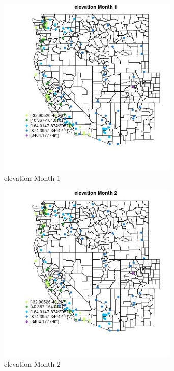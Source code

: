 \begin{figure} 
\centering  
\includegraphics[width=0.77\textwidth]{Code_Outputs/Report_ML_input_PM25_Step4_part_e_de_duplicated_aves_MapObsMo1elevation.jpg} 
\caption{\label{fig:Report_ML_input_PM25_Step4_part_e_de_duplicated_avesMapObsMo1elevation}elevation Month 1} 
\end{figure} 
 

\clearpage 

\begin{figure} 
\centering  
\includegraphics[width=0.77\textwidth]{Code_Outputs/Report_ML_input_PM25_Step4_part_e_de_duplicated_aves_MapObsMo2elevation.jpg} 
\caption{\label{fig:Report_ML_input_PM25_Step4_part_e_de_duplicated_avesMapObsMo2elevation}elevation Month 2} 
\end{figure} 
 

